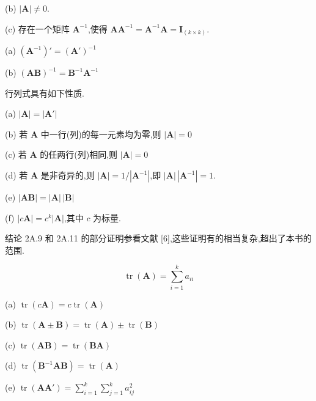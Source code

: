 (b) $|\bm{A}| \neq 0$.

(c) 存在一个矩阵 $\bm{A}^{-1}$,使得 $\bm{A}\bm{A}^{-1} = \bm{A}^{-1}\bm{A} = \bm{I}_{(k\times k)}$.


(a) $(\bm{A}^{-1})' = (\bm{A}')^{-1}$

(b) $(\bm{A}\bm{B})^{-1} = \bm{B}^{-1}\bm{A}^{-1}$

行列式具有如下性质.


(a) $|\bm{A}| = |\bm{A}'|$

(b) 若 $\bm{A}$ 中一行(列)的每一元素均为零,则 $|\bm{A}| = 0$

(c) 若 $\bm{A}$ 的任两行(列)相同,则 $|\bm{A}| = 0$

(d) 若 $\bm{A}$ 是非奇异的,则 $|\bm{A}| = 1/|\bm{A}^{-1}|$,即 $|\bm{A}|\,|\bm{A}^{-1}| = 1$.

(e) $|\bm{A}\bm{B}| = |\bm{A}|\,|\bm{B}|$

(f) $|c\bm{A}| = c^k|\bm{A}|$,其中 $c$ 为标量.

结论 2A.9 和 2A.11 的部分证明参看文献 [6],这些证明有的相当复杂,超出了本书的范围.

\[
\operatorname{tr}(\bm{A}) = \sum_{i=1}^{k}a_{ii}
\]


(a) $\operatorname{tr}(c\bm{A}) = c\operatorname{tr}(\bm{A})$

(b) $\operatorname{tr}(\bm{A}\pm\bm{B}) = \operatorname{tr}(\bm{A}) \pm \operatorname{tr}(\bm{B})$

(c) $\operatorname{tr}(\bm{A}\bm{B}) = \operatorname{tr}(\bm{B}\bm{A})$

(d) $\operatorname{tr}(\bm{B}^{-1}\bm{A}\bm{B}) = \operatorname{tr}(\bm{A})$

(e) $\operatorname{tr}(\bm{A}\bm{A}') = \sum_{i=1}^{k}\sum_{j=1}^{k}a_{ij}^2$

